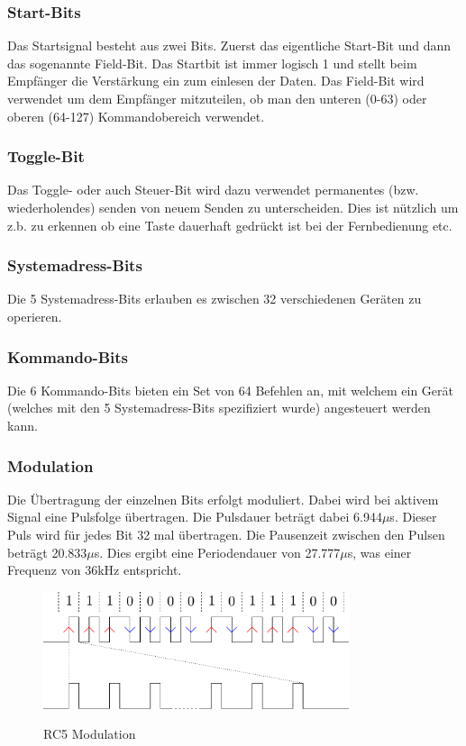 \subsubsection{Start-Bits}
Das Startsignal besteht aus zwei Bits. Zuerst das eigentliche Start-Bit
und dann das sogenannte Field-Bit. Das Startbit ist immer logisch 1 und
stellt beim Empfänger die Verstärkung ein zum einlesen der Daten.
Das Field-Bit wird verwendet um dem Empfänger mitzuteilen, ob man den
unteren (0-63) oder oberen (64-127) Kommandobereich verwendet.

\subsubsection{Toggle-Bit}
Das Toggle- oder auch Steuer-Bit wird dazu verwendet permanentes (bzw. 
wiederholendes) senden von neuem Senden zu unterscheiden.
Dies ist nützlich um z.b. zu erkennen ob eine Taste dauerhaft gedrückt ist
bei der Fernbedienung etc.

\subsubsection{Systemadress-Bits}
Die 5 Systemadress-Bits erlauben es zwischen 32 verschiedenen Geräten
zu operieren.

\subsubsection{Kommando-Bits}
Die 6 Kommando-Bits bieten ein Set von 64 Befehlen an, mit welchem ein
Gerät (welches mit den 5 Systemadress-Bits spezifiziert wurde) angesteuert
werden kann.

\subsubsection{Modulation}
Die Übertragung der einzelnen Bits erfolgt moduliert. Dabei wird bei aktivem
Signal eine Pulsfolge übertragen. Die Pulsdauer beträgt dabei 6.944$\mu$s. 
Dieser Puls wird für jedes Bit 32 mal übertragen. Die Pausenzeit zwischen den Pulsen beträgt 20.833$\mu$s. Dies ergibt eine Periodendauer von 27.777$\mu$s, was einer Frequenz von 36kHz entspricht. 
\begin{figure}[h!]
    \centering
    \includegraphics[width=0.8\textwidth]{rc5_modul.pdf}
    \label{pic:rc5_modul}
    \caption{RC5 Modulation}
\end{figure}

